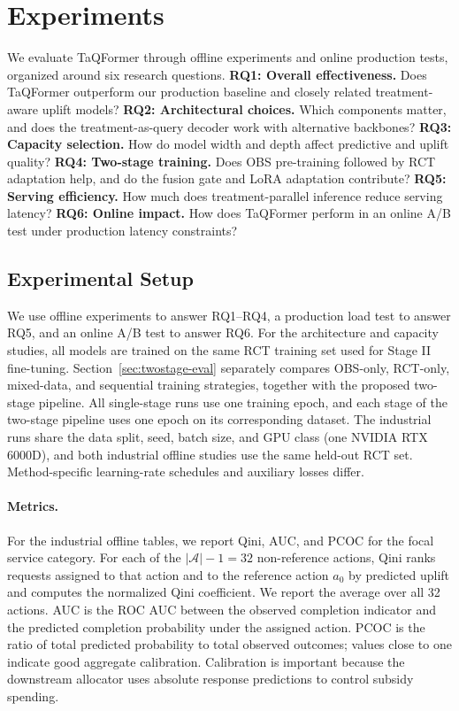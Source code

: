 \documentclass[sigconf,nonacm]{acmart}
\newcommand{\model}{TaQFormer\xspace}
\begin{document}
\section{Experiments}
\label{sec:experiments}
We evaluate \model through offline experiments and online production tests,
organized around six research questions.
\textbf{RQ1: Overall effectiveness.}
Does \model outperform our production baseline and closely related
treatment-aware uplift models?
\textbf{RQ2: Architectural choices.}
Which components matter, and does the treatment-as-query decoder work with
alternative backbones?
\textbf{RQ3: Capacity selection.}
How do model width and depth affect predictive and uplift quality?
\textbf{RQ4: Two-stage training.}
Does OBS pre-training followed by RCT adaptation help, and do the fusion gate
and LoRA adaptation contribute?
\textbf{RQ5: Serving efficiency.}
How much does treatment-parallel inference reduce serving latency?
\textbf{RQ6: Online impact.}
How does \model perform in an online A/B test under production latency
constraints?

\subsection{Experimental Setup}
\label{sec:offline-eval}

We use offline experiments to answer RQ1--RQ4, a production load test to
answer RQ5, and an online A/B test to answer RQ6. For the architecture and capacity studies, all models are trained on the same RCT training set used for Stage II fine-tuning. Section~\ref{sec:twostage-eval} separately compares OBS-only, RCT-only,
mixed-data, and sequential training strategies, together with the
proposed two-stage pipeline. All single-stage runs use one training epoch, and each stage of the two-stage pipeline uses one epoch on its corresponding dataset. The industrial runs share the data split, seed, batch size, and GPU class (one NVIDIA RTX 6000D), and both industrial offline studies use the same held-out RCT set. Method-specific learning-rate schedules and auxiliary losses differ.

\paragraph{Metrics.}
For the industrial offline tables, we report Qini, AUC, and PCOC for the focal service category. For each of the
$|\mathcal A|-1=32$ non-reference actions, Qini ranks requests assigned to
that action and to the reference action $a_0$ by predicted uplift and computes
the normalized Qini coefficient. We report the average over all 32 actions.
AUC is the ROC AUC between the observed completion indicator and the
predicted completion probability under the assigned action. PCOC is the ratio of total predicted
probability to total observed outcomes; values close to one indicate good
aggregate calibration. Calibration is important because the downstream allocator uses
absolute response predictions to control subsidy spending.
\end{document}
